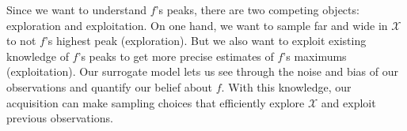 Since we want to understand $f$'s peaks,
there are two competing objects: exploration and exploitation.
On one hand, we want to sample far and wide in $\mathcal{X}$ to not $f$'s highest peak (exploration).
But we also want to exploit existing knowledge of $f$'s peaks to get more precise estimates of $f$'s maximums (exploitation).
Our surrogate model lets us see through the noise and bias of our observations and quantify our belief about $f$.
With this knowledge, our acquisition can make sampling choices that efficiently explore $\mathcal{X}$ and exploit previous observations.


